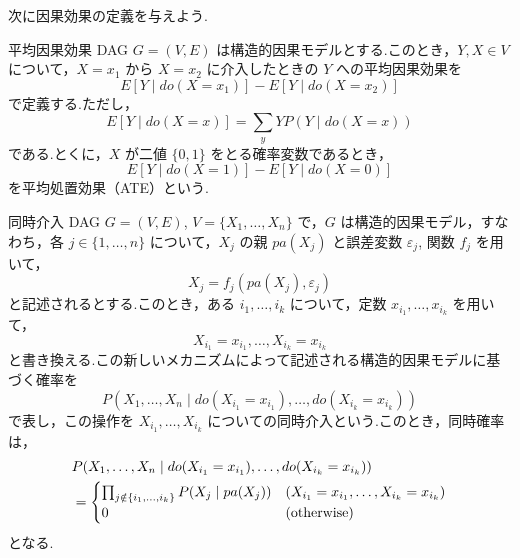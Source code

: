 \documentclass[uplatex, dvipdfmx]{jsarticle}
\begin{document}
次に因果効果の定義を与えよう.
\begin{defn}{平均因果効果}
  DAG $G=(V,E)$ は構造的因果モデルとする.このとき，$Y, X \in V$ について，$X=x_1$ から $X=x_2$ に介入したときの $Y$ への平均因果効果を
  \begin{equation}
    E[Y \mid do(X=x_1)] - E[Y \mid do(X=x_2)]
  \end{equation}
  で定義する.ただし，
  \begin{equation}
    E[Y \mid do(X=x)] = \sum_y Y P(Y \mid do(X=x))
  \end{equation}
  である.とくに，$X$ が二値 $\{0, 1\}$ をとる確率変数であるとき，
  \begin{equation}
    E[Y \mid do(X=1)] - E[Y \mid do(X=0)]
  \end{equation}
  を平均処置効果（ATE）という.
\end{defn}

\begin{defn}{同時介入}
  DAG $G=(V,E)$, $V=\{X_1, \dots, X_n\}$ で，$G$ は構造的因果モデル，すなわち，各 $j \in \{1, \dots, n\}$ について，$X_j$ の親 $pa(X_j)$ と誤差変数 $\varepsilon_j$, 関数 $f_j$ を用いて，
  \begin{equation}
    X_j = f_j(pa(X_j), \varepsilon_j)
  \end{equation}
  と記述されるとする.このとき，ある $i_1, \dots, i_k$ について，定数 $x_{i_1}, \dots, x_{i_k}$ を用いて，
  \begin{equation}
    X_{i_1} = x_{i_1}, \dots, X_{i_k} = x_{i_k}
  \end{equation}
  と書き換える.この新しいメカニズムによって記述される構造的因果モデルに基づく確率を
  \begin{equation}
    P(X_1, \dots, X_n \mid do(X_{i_1}=x_{i_1}), \dots, do(X_{i_k}=x_{i_k}))
  \end{equation}
  で表し，この操作を $X_{i_1}, \dots, X_{i_k}$ についての同時介入という.このとき，同時確率は，
  \begin{align}
    &P(X_1, \dots, X_n \mid do(X_{i_1}=x_{i_1}), \dots, do(X_{i_k}=x_{i_k})) \notag \\
    &= \begin{cases} 
      \prod_{j \notin \{i_1, \dots, i_k\}} P(X_j \mid pa(X_j)) & (X_{i_1}=x_{i_1}, \dots, X_{i_k}=x_{i_k}) \\ 
      0 & (\text{otherwise}) 
    \end{cases}
  \end{align}
  となる.
\end{defn}
\end{document}
